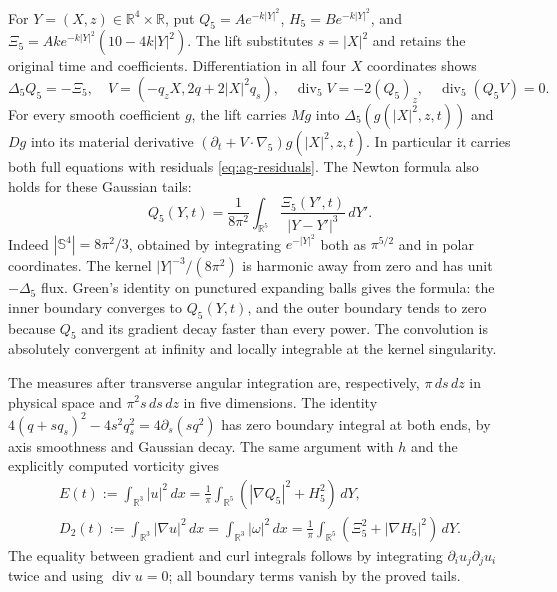 For \(Y=(X,z)\in\mathbb R^4\times\mathbb R\), put
\(Q_5=Ae^{-k|Y|^2}\), \(H_5=Be^{-k|Y|^2}\), and
\(\Xi_5=Ake^{-k|Y|^2}(10-4k|Y|^2)\).  The lift substitutes
\(s=|X|^2\) and retains the original time and coefficients.
Differentiation in all four \(X\) coordinates shows
\[
 \Delta_5Q_5=-\Xi_5,\quad
 V=(-q_z X,2q+2|X|^2q_s),\quad
 \operatorname{div}_5V=-2(Q_5)_z,\quad
 \operatorname{div}_5(Q_5V)=0.
\]
For every smooth coefficient \(g\), the lift carries \(Mg\) into
\(\Delta_5(g(|X|^2,z,t))\) and \(Dg\) into its material derivative
\((\partial_t+V\cdot\nabla_5)g(|X|^2,z,t)\).  In particular it
carries both full equations with residuals \eqref{eq:ag-residuals}.
The Newton formula also holds for these Gaussian tails:
\[
 Q_5(Y,t)=\frac1{8\pi^2}\int_{\mathbb R^5}
                 \frac{\Xi_5(Y',t)}{|Y-Y'|^3}\,dY'.
\]
Indeed \(|\mathbb S^4|=8\pi^2/3\), obtained by integrating
\(e^{-|Y|^2}\) both as \(\pi^{5/2}\) and in polar coordinates.
The kernel \(|Y|^{-3}/(8\pi^2)\) is harmonic away from zero and has
unit \(-\Delta_5\) flux.  Green's identity on punctured expanding
balls gives the formula: the inner boundary converges to \(Q_5(Y,t)\),
and the outer boundary tends to zero because \(Q_5\) and its gradient
decay faster than every power.  The convolution is absolutely convergent
at infinity and locally integrable at the kernel singularity.

The measures after transverse angular integration are, respectively,
\(\pi\,ds\,dz\) in physical space and \(\pi^2s\,ds\,dz\) in
five dimensions.  The identity
\(4(q+s q_s)^2-4s^2q_s^2=4\partial_s(sq^2)\) has zero boundary
integral at both ends, by axis smoothness and Gaussian decay.  The same
argument with \(h\) and the explicitly computed vorticity gives
\begin{equation}\label{eq:ag-energy-morphism}
 \begin{gathered}
 E(t):=\int_{\mathbb R^3}|u|^2\,dx
       =\frac1\pi\int_{\mathbb R^5}(|\nabla Q_5|^2+H_5^2)\,dY,\\
 D_2(t):=\int_{\mathbb R^3}|\nabla u|^2\,dx
       =\int_{\mathbb R^3}|\omega|^2\,dx
       =\frac1\pi\int_{\mathbb R^5}(\Xi_5^2+|\nabla H_5|^2)\,dY.
 \end{gathered}
\end{equation}
The equality between gradient and curl integrals follows by integrating
\(\partial_i u_j\partial_j u_i\) twice and using \(\operatorname{div}u=0\);
all boundary terms vanish by the proved tails.

